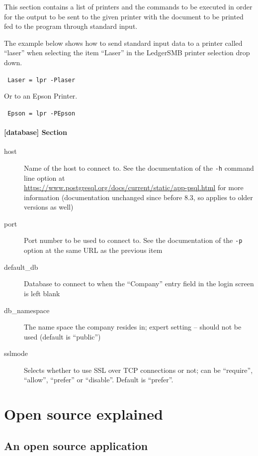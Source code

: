 This section contains a list of printers and the commands
to be executed in order for the output to be sent to the given printer with
the document to be printed fed to the program through standard input.

The example below shows how to send standard input data to a printer called ``laser''
when selecting the item ``Laser'' in the LedgerSMB printer selection drop down.

\texttt{
        Laser    = lpr -Plaser
}

Or to an Epson Printer.

\texttt{
        Epson   = lpr -PEpson
}


\subsubsection{[database] Section}
\label{subsubsec-global-config-ledgersmb-conf-database}

\begin{description}
        \item [host] Name of the host to connect to. See the documentation of the {\tt -h} command line option at\\
        \url{https://www.postgresql.org/docs/current/static/app-psql.html}
        for more information (documentation unchanged since before 8.3, so applies to older versions as well)
        \item [port] Port number to be used to connect to. See the documentation of the {\tt -p} option at the
        same URL as the previous item
        \item [default\_db] Database to connect to when the ``Company'' entry field in the login screen is left blank
        \item [db\_namespace] The name space the company resides in; expert setting -- should not be used (default is
        ``public'')
        \item [sslmode] Selects whether to use \gls{SSL} over TCP connections or not; can be ``require'', ``allow'',
        ``prefer'' or ``disable''.  Default is ``prefer''.
\end{description}

\chapter{Open source explained}
\label{app-open-source-explained}

\section{An open source application}
\label{sec-open-source-application}

